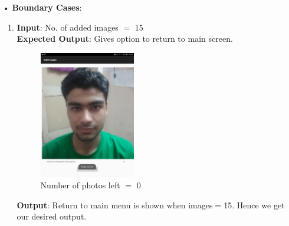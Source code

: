 \documentclass{scrreprt}
\begin{document}
\begin{itemize}
\begin{enumerate}
\end{enumerate}
\item[•]\textbf{Boundary Cases}:
\begin{enumerate}
\item \textbf{Input}: No. of added images $=$ 15 \\
\textbf{Expected Output}: Gives option to return to main screen.
\begin{figure}[H]
\centering
\includegraphics[width=0.42\textwidth, keepaspectratio]{imgboun.jpg}
\caption{Number of photos left $=$ 0}
\end{figure}
\textbf{Output}: Return to main menu is shown when images$=$15. Hence we get our desired output.

\end{enumerate}
\end{itemize}
\end{document}
